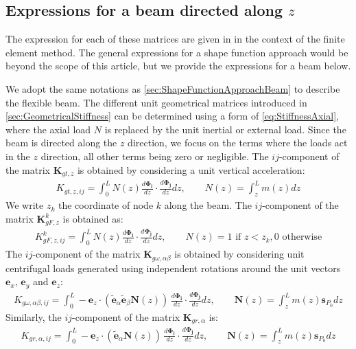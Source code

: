 \documentclass[wes, manuscript]{copernicus}
\renewcommand{\v}[1]{\boldsymbol{#1}}
\newcommand{\m}[1]{\boldsymbol{#1}}
\newcommand{\todoBoth}    [1]{{\colorbox{yellow}{TODO Both:    }}{\color{red}{#1}}\colorbox{yellow}{/}}
\begin{document}
\subsection{Expressions for a beam directed along $z$}
The expression for each of these matrices are given in \cite{Schwertassek:book} in the context of the finite element method.  The general expressions for a shape function approach would be beyond the scope of this article, but we provide the expressions for a beam below.


We adopt the same notations as \autoref{sec:ShapeFunctionApproachBeam} to describe the flexible beam.
The different unit geometrical matrices introduced in \autoref{sec:GeometricalStiffness} can be determined using a form of \autoref{eq:StiffnessAxial}, where the axial load $N$ is replaced by the unit inertial or external load. Since the beam is directed along the $z$ direction, we focus on the terms where the loads act in the $z$ direction, all other terms being zero or negligible.
The $ij$-component of the matrix $\m{K}_{gt,z}$ is obtained by considering a unit vertical acceleration:
\begin{align}
   K_{gt,z,ij} = \int_0^L N(z) \frac{d\v{\Phi_i}}{dz}\cdot\frac{d\v{\Phi_j}}{dz} dz, 
   \qquad
   N(z) = \int_z^L m(z) dz
\end{align}
% 
We write $z_k$ the coordinate of node $k$ along the beam. The $ij$-component of the matrix $\m{K}_{gF,z}^k$ is obtained as:
\begin{align}
   K_{gF,z,ij}^k = \int_0^L N(z) \frac{d\v{\Phi_i}}{dz}\cdot\frac{d\v{\Phi_j}}{dz} dz, 
   \qquad
   N(z) = 1 \text{ if $z<z_k$}, 0 \text{ otherwise} 
\end{align}
The $ij$-component of the matrix $\m{K}_{g\omega,\alpha\beta}$ is obtained by considering unit centrifugal loads generated using independent rotations around the unit vectors $\v{e}_x$, $\v{e}_y$ and $\v{e}_z$:
\begin{align}
   K_{g\omega,\alpha\beta,ij} = \int_0^L -\v{e}_z\cdot\left(\tilde{\v{e}}_\alpha\tilde{\v{e}}_\beta \v{N}(z) \right)
   \, \frac{d\v{\Phi_i}}{dz}\cdot\frac{d\v{\Phi_j}}{dz} dz, 
   \qquad
   \v{N}(z) =  \int_z^L m(z) \v{s}_{P_0} dz
\end{align}
Similarly, the $ij$-component of the matrix $\m{K}_{gr,\alpha}$ is:
\begin{align}
   K_{gr,\alpha,ij} = \int_0^L -\v{e}_z\cdot\left(\tilde{\v{e}}_\alpha \v{N}(z) \right)
   \, \frac{d\v{\Phi_i}}{dz}\cdot\frac{d\v{\Phi_j}}{dz} dz, 
   \qquad
   \v{N}(z) =  \int_z^L m(z) \v{s}_{P_0} dz
\end{align}
\end{document}
